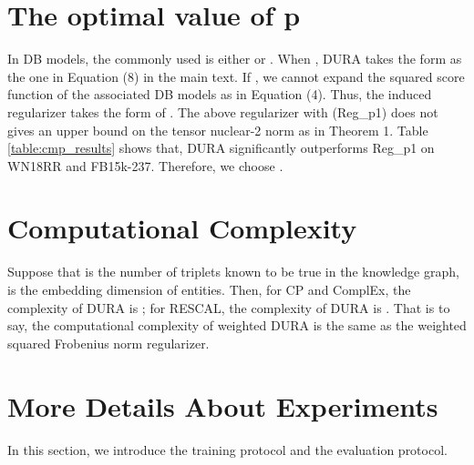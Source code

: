 \documentclass{article}
\begin{document}
\section{The optimal value of p}
In DB models, the commonly used  is either  or . When , DURA takes the form as the one in Equation (8) in the main text. If , we cannot expand the squared score function of the associated DB models as in Equation (4).
Thus, the induced regularizer takes the form of . The above regularizer with  (Reg\_p1) does not gives an upper bound on the tensor nuclear-2 norm as in Theorem 1. Table \ref{table:cmp_results} shows that, DURA significantly outperforms Reg\_p1 on WN18RR and FB15k-237. Therefore, we choose .

\section{Computational Complexity}
Suppose that  is the number of triplets known to be true in the knowledge graph,  is the embedding dimension of entities. Then, for CP and ComplEx, the complexity of DURA is ; for RESCAL, the complexity of DURA is . That is to say, the computational complexity of weighted DURA is the same as the weighted squared Frobenius norm regularizer. 

\section{More Details About Experiments}
In this section, we introduce the training protocol and the evaluation protocol.
\begin{table}[t]
    \centering
    \caption{Hyperparameters found by grid search.  is the embedding size,  is the batch size,  is the regularization coefficients, and  and  are weights for different parts of the regularizer.}
    \label{table:hp}
    \vskip 0.1in
   
\end{table}
\end{document}
